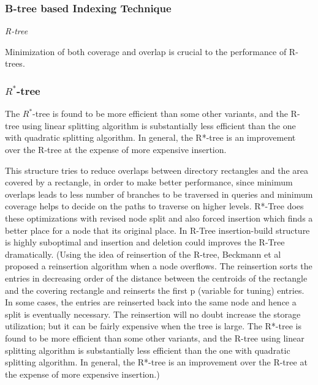 \documentclass[a4paper,12pt]{article}
\begin{document}
\subsubsection{B-tree based Indexing Technique}
\emph{R-tree}

Minimization of both coverage and overlap is crucial to the performance of R-trees.
\subsubsection{$R^*$-tree}
The $R^*$-tree is found to be more efficient than some other variants, and the R-tree using linear splitting algorithm is substantially less efficient than the one with quadratic splitting algorithm. In general, the R*-tree is an improvement over the R-tree at the expense of more expensive insertion.

This structure tries to reduce overlaps between directory rectangles and the area covered by a rectangle, in order to make better performance, since minimum overlaps leads to less number of branches to be traversed in queries and minimum coverage helps to decide on the paths to traverse on higher levels. 
R*-Tree does these optimizations with revised node split and also forced insertion which finds a better place for a node that its original place. In R-Tree insertion-build structure is highly suboptimal and insertion and deletion could improves the R-Tree dramatically.
 (Using the idea of reinsertion of the R-tree, Beckmann et al proposed a reinsertion algorithm when a node overflows. The reinsertion sorts the entries in decreasing order of the distance between the centroids of the rectangle and the covering rectangle and reinserts the first p (variable for tuning) entries. In some cases, the entries are reinserted back into the same node and hence a split is eventually necessary. The reinsertion will no doubt increase the storage utilization; but it can be fairly expensive when the tree is large. The R*-tree is found to be more efficient than some other variants, and the R-tree using linear splitting algorithm is substantially less efficient than the one with quadratic splitting algorithm. In general, the R*-tree is an improvement over the R-tree at the expense of more expensive insertion.)
\end{document}
